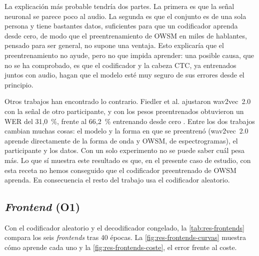 La explicación más probable tendría dos partes. La primera es que la señal neuronal se parece poco al audio. La segunda es que el conjunto es de una sola persona y tiene bastantes datos, suficientes para que un codificador aprenda desde cero, de modo que el preentrenamiento de OWSM en miles de hablantes, pensado para ser general, no supone una ventaja. Esto explicaría que el preentrenamiento no ayude, pero no que impida aprender: una posible causa, que no se ha comprobado, es que el codificador y la cabeza CTC, ya entrenados juntos con audio, hagan que el modelo esté muy seguro de sus errores desde el principio.

Otros trabajos han encontrado lo contrario. Fiedler et al. ajustaron wav2vec~2.0 con la señal de otro participante, y con los pesos preentrenados obtuvieron un WER del 31,0~\%, frente al 66,2~\% entrenando desde cero \cite{fiedler2025wav2vec2brain}. Entre los dos trabajos cambian muchas cosas: el modelo y la forma en que se preentrenó (wav2vec~2.0 aprende directamente de la forma de onda y OWSM, de espectrogramas), el participante y los datos. Con un solo experimento no se puede saber cuál pesa más. Lo que sí muestra este resultado es que, en el presente caso de estudio, con esta receta no hemos conseguido que el codificador preentrenado de OWSM aprenda. En consecuencia el resto del trabajo usa el codificador aleatorio.

\subsection{\textit{Frontend} (O1)}
\label{sec:res-frontend}

Con el codificador aleatorio y el decodificador congelado, la \cref{tab:res-frontends} compara los seis \textit{frontends} tras 40 épocas. La \cref{fig:res-frontends-curvas} muestra cómo aprende cada uno y la \cref{fig:res-frontends-coste}, el error frente al coste.

